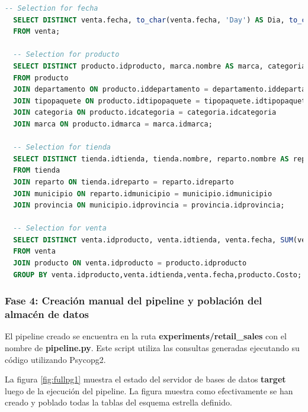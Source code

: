 \begin{lstlisting}[label={selectexp1}, caption={Consultas de selecci\'on generadas para el experimento 1}, language={sql}]
  -- Selection for fecha
  SELECT DISTINCT venta.fecha, to_char(venta.fecha, 'Day') AS Dia, to_char(venta.fecha, 'Month') AS Mes
  FROM venta;

  -- Selection for producto
  SELECT DISTINCT producto.idproducto, marca.nombre AS marca, categoria.nombre AS categoria, tipopaquete.nombre AS paquete, departamento.nombre AS departamento, departamento.descripcion AS descripcion, producto.nombre AS producto, producto.precio, producto.costo
  FROM producto
  JOIN departamento ON producto.iddepartamento = departamento.iddepartamento
  JOIN tipopaquete ON producto.idtipopaquete = tipopaquete.idtipopaquete
  JOIN categoria ON producto.idcategoria = categoria.idcategoria
  JOIN marca ON producto.idmarca = marca.idmarca;

  -- Selection for tienda
  SELECT DISTINCT tienda.idtienda, tienda.nombre, reparto.nombre AS reparto, municipio.nombre AS municipio, provincia.nombre AS provincia
  FROM tienda
  JOIN reparto ON tienda.idreparto = reparto.idreparto
  JOIN municipio ON reparto.idmunicipio = municipio.idmunicipio
  JOIN provincia ON municipio.idprovincia = provincia.idprovincia;

  -- Selection for venta
  SELECT DISTINCT venta.idproducto, venta.idtienda, venta.fecha, SUM(venta.cantidad_vendida) AS cantidad_vendida_total, SUM(venta.pago) AS importe_total, producto.Costo*SUM(venta.cantidad_vendida) AS coste_total, SUM(venta.pago)-producto.Costo*SUM(venta.cantidad_vendida) AS ganancia
  FROM venta
  JOIN producto ON venta.idproducto = producto.idproducto
  GROUP BY venta.idproducto,venta.idtienda,venta.fecha,producto.Costo;
\end{lstlisting}

\subsubsection{Fase 4: Creaci\'on manual del pipeline y poblaci\'on del almac\'en de datos}

El pipeline creado se encuentra en la ruta \textbf{experiments/retail\_sales} con el nombre de 
\textbf{pipeline.py}. Este script utiliza las consultas generadas ejecutando su código utilizando 
Psycopg2.

La figura \ref{fig:fullpg1} muestra el estado del servidor de bases de datos \textbf{target} luego de la ejecución 
del pipeline. La figura muestra como efectivamente 
se han creado y poblado todas la tablas del esquema estrella definido.

